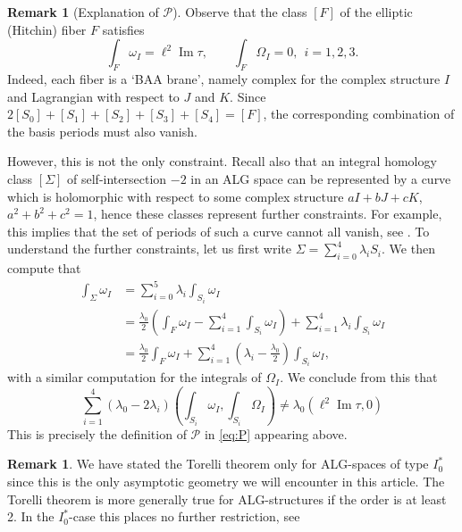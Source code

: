 \documentclass[12pt,letterpaper,reqno]{amsart}
\theoremstyle{remark}
\theoremstyle{definition}
\newtheorem{rem}[thm]{Remark}
\numberwithin{thm}{section}
\numberwithin{equation}{section}
\numberwithin{figure}{section}
\DeclareMathOperator{\im}{Im}
\begin{document}
\begin{rem}[Explanation of $\mathcal{P}$]
Observe that the class $[F]$ of the elliptic (Hitchin) fiber $F$ satisfies
\begin{equation} 
\int_F \omega_I = \ell^2 \im \tau, \qquad \int_F \Omega_I=0,\ \ i = 1, 2, 3.
\label{eq:fiberintegral}
\end{equation}
Indeed, each fiber is a `BAA brane', namely complex for the complex structure $I$ and Lagrangian with respect to $J$ and $K$.  Since
$2[S_0] + [S_1] + [S_2] + [S_3] + [S_4] = [F]$, the corresponding combination of the basis periods must also vanish.  

However, this is not the only constraint. Recall also that an integral homology class $[\Sigma]$ of self-intersection $-2$ in an ALG space can be represented by a curve
which is holomorphic with respect to some complex structure $aI + bJ + cK$, $a^2 + b^2 + c^2 = 1$, hence these
classes represent further constraints. For example, this implies that the set of periods of such a curve cannot all vanish, see \cite{LeeLin}.  To understand the
further constraints, let us first write $\Sigma = \sum_{i=0}^4 \lambda_i S_i$.  We then compute that
\begin{align*}  
\int_\Sigma \omega_I & = \sum_{i=0}^5 \lambda_i \int_{S_i} \omega_I  \\
&= \frac{\lambda_0}{2}\left(\int_F \omega_I - 
\sum_{i=1}^4 \int_{S_i} \omega_I\right) + \sum_{i=1}^4 \lambda_i \int_{S_i} \omega_I\\   &=\frac{\lambda_0}{2} \int_F \omega_I + \sum_{i=1}^4 \left(\lambda_i - \frac{\lambda_0}{2}\right)\int_{S_i}\omega_I,
\end{align*}
with a similar computation for the integrals of $\Omega_I$.  We conclude from this that 
\[
 \sum_{i=1}^4 (\lambda_0 - 2 \lambda_i)\left( \int_{S_i} \omega_I , \int_{S_i} \Omega_I\right)  \neq \lambda_0 ( \ell^2 \im \tau, 0) 
\]
This is precisely the definition of $\mathcal{P}$ in \eqref{eq:P} appearing above.
\end{rem}



\begin{rem}
	We have stated the Torelli theorem only for ALG-spaces of type $I_0^*$ since this is the only asymptotic geometry we will encounter in this article. The Torelli theorem is more generally true for ALG-structures if the order is at least 2. In the $I_0^*$-case this places no further restriction, see \cite{CVZ2024}
\end{rem} 
\end{document}
